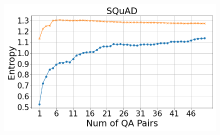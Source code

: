 \documentclass[11pt]{article}
\begin{document}
\begin{figure}[h!]
\begin{minipage}[h]{0.33\linewidth}
    \label{fig:squad-avg-cov-per-qa}
    \end{minipage}
    \begin{minipage}[h]{0.33\linewidth}
        \centering
        \includegraphics[width=\textwidth]{submissions/Tung2023/figs/Squad_Entropy.png}
    \label{fig:squad-entropy}
    \end{minipage}


\end{figure}
\end{document}
